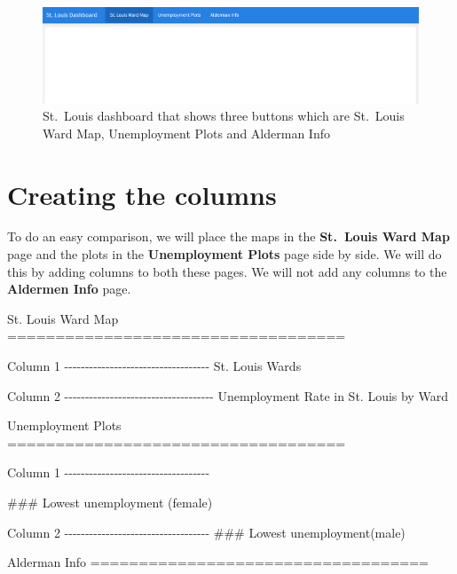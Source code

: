 \documentclass[
  krantz2]{krantz}
\makeatletter
\newenvironment{Shaded}{\begin{snugshade}}{\end{snugshade}}
\newcommand{\FunctionTok}[1]{\textcolor[rgb]{0,0,0}{#1}}
\newcommand{\NormalTok}[1]{#1}
\newenvironment{kframe}{%
\medskip{}
\setlength{\fboxsep}{.8em}
 \def\at@end@of@kframe{}%
 \ifinner\ifhmode%
  \def\at@end@of@kframe{\end{minipage}}%
  \begin{minipage}{\columnwidth}%
 \fi\fi%
 \def\FrameCommand##1{\hskip\@totalleftmargin \hskip-\fboxsep
 \colorbox{shadecolor}{##1}\hskip-\fboxsep
     \hskip-\linewidth \hskip-\@totalleftmargin \hskip\columnwidth}%
 \MakeFramed {\advance\hsize-\width
   \@totalleftmargin\z@ \linewidth\hsize
   \@setminipage}}%
 {\par\unskip\endMakeFramed%
 \at@end@of@kframe}
\renewenvironment{Shaded}{\begin{kframe}}{\end{kframe}}
\makeatother
\begin{document}
\begin{figure}
\centering
\includegraphics{images/stl_dashboard1.png}
\caption{St.~Louis dashboard that shows three buttons which are St.~Louis Ward Map, Unemployment Plots and Alderman Info}
\end{figure}

\hypertarget{creating-the-columns}{%
\section{Creating the columns}\label{creating-the-columns}}

To do an easy comparison, we will place the maps in the \textbf{St.~Louis Ward Map} page and the plots in the \textbf{Unemployment Plots} page side by side. We will do this by adding columns to both these pages. We will not add any columns to the \textbf{Aldermen Info} page.

\begin{Shaded}
\begin{Highlighting}[]
\NormalTok{St. Louis Ward Map}
\FunctionTok{===================================}

\NormalTok{Column 1}
\NormalTok{{-}{-}{-}{-}{-}{-}{-}{-}{-}{-}{-}{-}{-}{-}{-}{-}{-}{-}{-}{-}{-}{-}{-}{-}{-}{-}{-}{-}{-}{-}{-}{-}{-}{-}{-}}
\NormalTok{St. Louis Wards}


\NormalTok{Column 2}
\NormalTok{{-}{-}{-}{-}{-}{-}{-}{-}{-}{-}{-}{-}{-}{-}{-}{-}{-}{-}{-}{-}{-}{-}{-}{-}{-}{-}{-}{-}{-}{-}{-}{-}{-}{-}{-}{-}}
\NormalTok{Unemployment Rate in St. Louis by Ward}


\NormalTok{Unemployment Plots}
\FunctionTok{===================================}


\NormalTok{Column 1}
\NormalTok{{-}{-}{-}{-}{-}{-}{-}{-}{-}{-}{-}{-}{-}{-}{-}{-}{-}{-}{-}{-}{-}{-}{-}{-}{-}{-}{-}{-}{-}{-}{-}{-}{-}{-}{-}}

\FunctionTok{\#\#\# Lowest unemployment (female)}


\NormalTok{Column 2}
\NormalTok{{-}{-}{-}{-}{-}{-}{-}{-}{-}{-}{-}{-}{-}{-}{-}{-}{-}{-}{-}{-}{-}{-}{-}{-}{-}{-}{-}{-}{-}{-}{-}{-}{-}{-}{-}}
\FunctionTok{\#\#\# Lowest unemployment(male)}



\NormalTok{Alderman Info}
\FunctionTok{===================================}
\end{Highlighting}
\end{Shaded}
\end{document}
